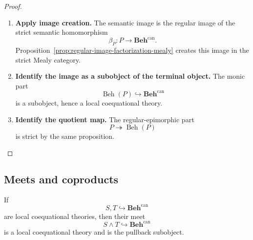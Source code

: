\begin{proof}
    \leavevmode
    \begin{enumerate}
        \item \textbf{Apply image creation.}
        The semantic image is the regular image of the strict semantic
        homomorphism
        \[
            \beta_P:P\to\mathbf{Beh}^{\mathrm{can}}.
        \]
        Proposition~\ref{prop:regular-image-factorization-mealy} creates this
        image in the strict Mealy category.

        \item \textbf{Identify the image as a subobject of the terminal object.}
        The monic part
        \[
            \operatorname{Beh}(P)\hookrightarrow\mathbf{Beh}^{\mathrm{can}}
        \]
        is a subobject, hence a local coequational theory.

        \item \textbf{Identify the quotient map.}
        The regular-epimorphic part
        \[
            P\twoheadrightarrow\operatorname{Beh}(P)
        \]
        is strict by the same proposition.
    \end{enumerate}
\end{proof}

\subsection{Meets and coproducts}
\label{subsec:meets-and-coproducts-local-theories}

\begin{lemma}
\label{lem:meets-local-theories}
    If
    \[
        S,T\hookrightarrow\mathbf{Beh}^{\mathrm{can}}
    \]
    are local coequational theories, then their meet
    \[
        S\wedge T\hookrightarrow\mathbf{Beh}^{\mathrm{can}}
    \]
    is a local coequational theory and is the pullback subobject.
\end{lemma}

